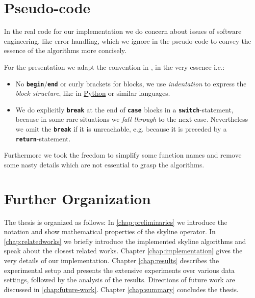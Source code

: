 \section{Pseudo-code}
In the real code for our implementation we do concern about issues of
software engineering, like error handling, which we ignore in the
pseudo-code to convey the essence of the algorithms more concisely.

For the presentation we adapt the convention in
\citep[Page~19]{Cormen2001}, in the very essence i.e.:

\begin{itemize}
\item 
No \texttt{\textbf{begin}}/\texttt{\textbf{end}} or curly brackets for
blocks, we use \emph{indentation} to express the \emph{block
structure}, like in \href{http://www.python.org/}{Python} or similar languages.

\item 
We do explicitly \texttt{\textbf{break}} at the end of
\texttt{\textbf{case}} blocks in a \texttt{\textbf{switch}}-statement,
because in some rare situations we \emph{fall through} to the next
case. Nevertheless we omit the \texttt{\textbf{break}} if it is
unreachable, e.g. because it is preceded by a
\texttt{\textbf{return}}-statement.
\end{itemize}

\noindent
Furthermore we took the freedom to simplify some function names and
remove some nasty details which are not essential to grasp the
algorithms.


\section{Further Organization}
The thesis is organized as follows: In \autoref{chap:preliminaries} we
introduce the notation and show mathematical properties of the skyline
operator.  In \autoref{chap:relatedworks} we briefly introduce the
implemented skyline algorithms and speak about the closest related
works. Chapter \ref{chap:implementation} gives the very details of our
implementation. Chapter \ref{chap:results} describes the experimental setup
and presents the extensive experiments over various data settings,
followed by the analysis of the results. Directions of future work are
discussed in \autoref{chap:future-work}. Chapter \ref{chap:summary}
concludes the thesis.






